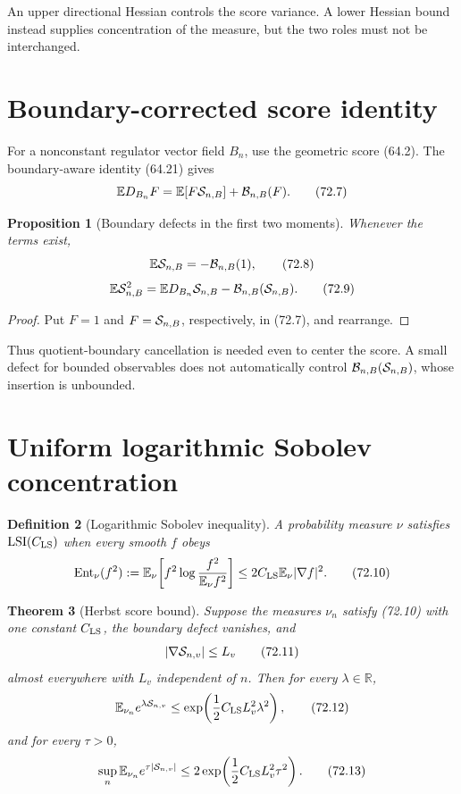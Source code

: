 \documentclass[11pt]{article}
\newtheorem{theorem}{Theorem}[section]
\newtheorem{proposition}[theorem]{Proposition}
\newtheorem{definition}[theorem]{Definition}
\theoremstyle{remark}
\begin{document}
An upper directional Hessian controls the score variance.  A lower
Hessian bound instead supplies concentration of the measure, but
the two roles must not be interchanged.

\section{Boundary-corrected score identity}

For a nonconstant regulator vector field \(B_n\), use the geometric
score (64.2).  The boundary-aware identity (64.21) gives
\[
 \mathbb E D_{B_n}F
 =
 \mathbb E[F{\cal S}_{n,B}]
 +{\cal B}_{n,B}(F).                                  \tag{72.7}
\]

\begin{proposition}[Boundary defects in the first two moments]
\label{prop:v15v72-boundary}
Whenever the terms exist,
\[
 \mathbb E{\cal S}_{n,B}
 =
 -{\cal B}_{n,B}(1),                                  \tag{72.8}
\]
\[
 \mathbb E{\cal S}_{n,B}^2
 =
 \mathbb E D_{B_n}{\cal S}_{n,B}
 -{\cal B}_{n,B}({\cal S}_{n,B}).                     \tag{72.9}
\]
\end{proposition}

\begin{proof}
Put \(F=1\) and \(F={\cal S}_{n,B}\), respectively, in (72.7), and
rearrange.
\end{proof}

Thus quotient-boundary cancellation is needed even to center the
score.  A small defect for bounded observables does not
automatically control
\({\cal B}_{n,B}({\cal S}_{n,B})\), whose insertion is unbounded.

\section{Uniform logarithmic Sobolev concentration}

\begin{definition}[Logarithmic Sobolev inequality]
\label{def:v15v72-lsi}
A probability measure \(\nu\) satisfies
\({\rm LSI}(C_{\rm LS})\) when every smooth \(f\) obeys
\[
 \operatorname{Ent}_\nu(f^2)
 :=
 \mathbb E_\nu\!\left[
 f^2\log\frac{f^2}{\mathbb E_\nu f^2}
 \right]
 \leq
 2C_{\rm LS}\mathbb E_\nu|\nabla f|^2.                \tag{72.10}
\]
\end{definition}

\begin{theorem}[Herbst score bound]
\label{thm:v15v72-herbst}
Suppose the measures \(\nu_n\) satisfy (72.10) with one constant
\(C_{\rm LS}\), the boundary defect vanishes, and
\[
 |\nabla{\cal S}_{n,v}|\leq L_v                       \tag{72.11}
\]
almost everywhere with \(L_v\) independent of \(n\).  Then for
every \(\lambda\in{\mathbb R}\),
\[
 \mathbb E_{\nu_n}e^{\lambda{\cal S}_{n,v}}
 \leq
 \exp\!\left(\frac12C_{\rm LS}L_v^2\lambda^2\right),   \tag{72.12}
\]
and for every \(\tau>0\),
\[
 \sup_n\mathbb E_{\nu_n}e^{\tau|{\cal S}_{n,v}|}
 \leq
 2\exp\!\left(\frac12C_{\rm LS}L_v^2\tau^2\right).
                                                               \tag{72.13}
\]
\end{theorem}
\end{document}
